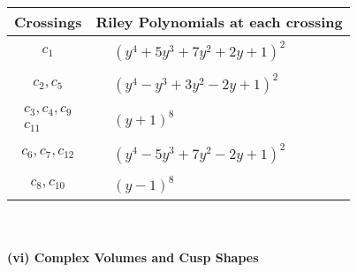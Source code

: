 \documentclass[1p]{elsarticle_modified}
\theoremstyle{definition}
\begin{document}
\begin{tabular}{m{50pt}|m{274pt}}
Crossings & \hspace{64pt}Riley Polynomials at each crossing \\
\hline $$\begin{aligned}c_{1}\end{aligned}$$&$\begin{aligned}
&(y^4+5 y^3+7 y^2+2 y+1)^2
\end{aligned}$\\
\hline $$\begin{aligned}c_{2},c_{5}\end{aligned}$$&$\begin{aligned}
&(y^4- y^3+3 y^2-2 y+1)^2
\end{aligned}$\\
\hline $$\begin{aligned}c_{3},c_{4},c_{9}\\c_{11}\end{aligned}$$&$\begin{aligned}
&(y+1)^8
\end{aligned}$\\
\hline $$\begin{aligned}c_{6},c_{7},c_{12}\end{aligned}$$&$\begin{aligned}
&(y^4-5 y^3+7 y^2-2 y+1)^2
\end{aligned}$\\
\hline $$\begin{aligned}c_{8},c_{10}\end{aligned}$$&$\begin{aligned}
&(y-1)^8
\end{aligned}$\\
\hline
\end{tabular}\\~\\
\newpage\flushleft \textbf{(vi) Complex Volumes and Cusp Shapes}
\end{document}

